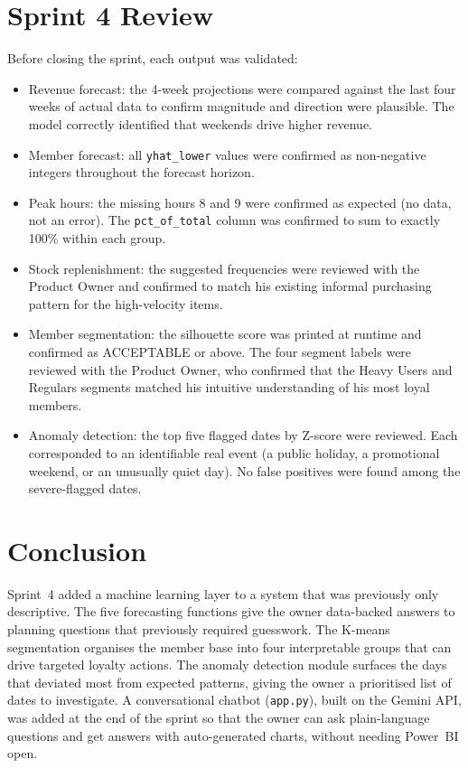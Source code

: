 \documentclass[12pt, a4paper]{report}
\begin{document}
\section{Sprint 4 Review}

Before closing the sprint, each output was validated:

\begin{itemize}
  \item Revenue forecast: the 4-week projections were compared against the last
        four weeks of actual data to confirm magnitude and direction were plausible.
        The model correctly identified that weekends drive higher revenue.
  \item Member forecast: all \texttt{yhat\_lower} values were confirmed as
        non-negative integers throughout the forecast horizon.
  \item Peak hours: the missing hours 8 and 9 were confirmed as expected
        (no data, not an error). The \texttt{pct\_of\_total} column was confirmed
        to sum to exactly 100\% within each group.
  \item Stock replenishment: the suggested frequencies were reviewed with the
        Product Owner and confirmed to match his existing informal purchasing
        pattern for the high-velocity items.
  \item Member segmentation: the silhouette score was printed at runtime and
        confirmed as ACCEPTABLE or above. The four segment labels were reviewed
        with the Product Owner, who confirmed that the Heavy Users and Regulars
        segments matched his intuitive understanding of his most loyal members.
  \item Anomaly detection: the top five flagged dates by Z-score were reviewed.
        Each corresponded to an identifiable real event (a public holiday, a
        promotional weekend, or an unusually quiet day). No false positives were
        found among the severe-flagged dates.
\end{itemize}

\section{Conclusion}

Sprint~4 added a machine learning layer to a system that was previously only
descriptive. The five forecasting functions give the owner data-backed answers to
planning questions that previously required guesswork. The K-means segmentation
organises the member base into four interpretable groups that can drive targeted
loyalty actions. The anomaly detection module surfaces the days that deviated most
from expected patterns, giving the owner a prioritised list of dates to investigate.
A conversational chatbot (\texttt{app.py}), built on the Gemini API, was added
at the end of the sprint so that the owner can ask plain-language questions and
get answers with auto-generated charts, without needing Power~BI open.
\end{document}
